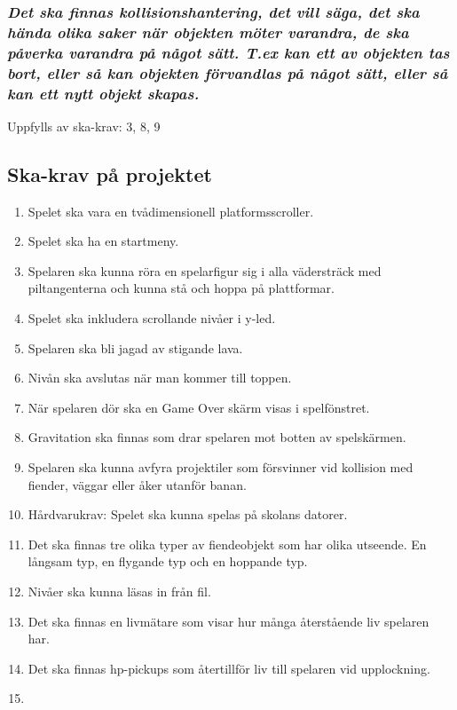 \documentclass{TDP005mall}
\begin{document}
\subsubsection{\emph{ Det ska finnas kollisionshantering, det vill säga, det ska hända olika saker när objekten möter varandra, de ska påverka varandra på något sätt. T.ex kan ett av objekten tas bort, eller så kan objekten förvandlas på något sätt, eller så kan ett nytt objekt skapas.}}
Uppfylls av ska-krav: 3, 8, 9



\subsection{Ska-krav på projektet}
\begin{enumerate}
\item Spelet ska vara en tvådimensionell platformsscroller.
\item Spelet ska ha en startmeny.
\item Spelaren ska kunna röra en spelarfigur sig i alla vädersträck med piltangenterna och kunna stå och hoppa på plattformar.
\item Spelet ska inkludera scrollande nivåer i y-led.
\item Spelaren ska bli jagad av stigande lava.
\item Nivån ska avslutas när man kommer till toppen.
\item När spelaren dör ska en Game Over skärm visas i spelfönstret.
\item Gravitation ska finnas som drar spelaren mot botten av spelskärmen.
\item Spelaren ska kunna avfyra projektiler som försvinner vid kollision med fiender, väggar eller åker utanför banan.
\item Hårdvarukrav: Spelet ska kunna spelas på skolans datorer.
\item Det ska finnas tre olika typer av fiendeobjekt som har olika utseende. En långsam typ, en flygande typ och en hoppande typ.
\item Nivåer ska kunna läsas in från fil.
\item Det ska finnas en livmätare som visar hur många återstående liv spelaren har.
\item Det ska finnas hp-pickups som återtillför liv till spelaren vid upplockning.
\item  

\end{enumerate}
\end{document}
